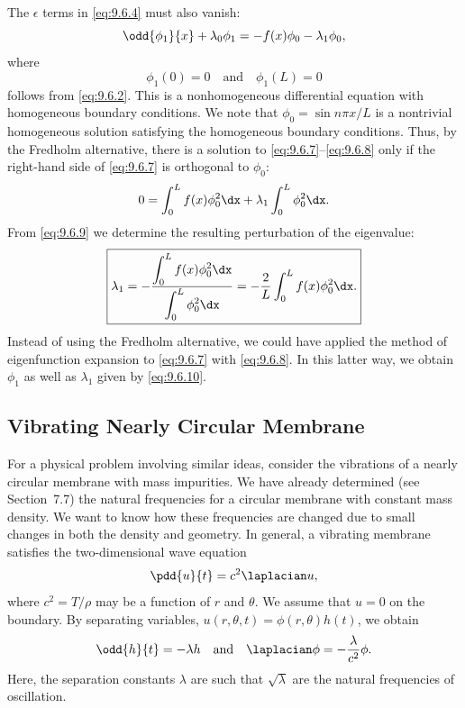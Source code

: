 The $\epsilon$ terms in \eqref{eq:9.6.4} must also vanish:
\begin{equation}
\label{eq:9.6.7}
\odd{\phi_1}{x} + \lambda_0\phi_1 = -f(x)\phi_0 - \lambda_1\phi_0,
\end{equation}
where
\begin{equation}
\label{eq:9.6.8}
\phi_1(0) = 0 \quad\text{and}\quad \phi_1(L) = 0
\end{equation}
follows from \eqref{eq:9.6.2}.  This is a nonhomogeneous differential equation with homogeneous boundary conditions.  We note that $\phi_0 = \sin n\pi x/L$ is a nontrivial homogeneous solution satisfying the homogeneous boundary conditions.  Thus, by the Fredholm alternative, there is a solution to \eqref{eq:9.6.7}--\eqref{eq:9.6.8} only if the right-hand side of \eqref{eq:9.6.7} is orthogonal to $\phi_0$:
\begin{equation}
\label{eq:9.6.9}
0 = \int_0^L f(x)\phi_0^2\dx + \lambda_1\int_0^L\phi_0^2\dx.
\end{equation}
From \eqref{eq:9.6.9} we determine the resulting perturbation of the eigenvalue:
\begin{equation}
\label{eq:9.6.10}
\boxed{\lambda_1 = -\frac{\displaystyle\int_0^L f(x)\phi_0^2\dx}{\displaystyle\int_0^L\phi_0^2\dx} = -\frac{2}{L}\int_0^L f(x)\phi_0^2\dx.}
\end{equation}
Instead of using the Fredholm alternative, we could have applied the method of eigenfunction expansion to \eqref{eq:9.6.7} with \eqref{eq:9.6.8}.  In this latter way, we obtain $\phi_1$ as well as $\lambda_1$ given by \eqref{eq:9.6.10}.

\subsection{Vibrating Nearly Circular Membrane}
\label{sec:perturbed-membrane}

For a physical problem involving similar ideas, consider the vibrations of a nearly circular membrane with mass impurities.  We have already determined (see Section~7.7) the natural frequencies for a circular membrane with constant mass density.  We want to know how these frequencies are changed due to small changes in both the density and geometry.  In general, a vibrating membrane satisfies the two-dimensional wave equation
\begin{equation}
\label{eq:9.6.11}
\pdd{u}{t} = c^2\laplacian u,
\end{equation}
where $c^2 = T/\rho$ may be a function of $r$ and $\theta$.  We assume that $u = 0$ on the boundary.  By separating variables, $u(r,\theta,t) = \phi(r,\theta)h(t)$, we obtain
\begin{equation}
\label{eq:9.6.12}
\odd{h}{t} = -\lambda h \quad\text{and}\quad \laplacian\phi = -\frac{\lambda}{c^2}\phi.
\end{equation}
Here, the separation constants $\lambda$ are such that $\sqrt{\lambda}$ are the natural frequencies of oscillation.

